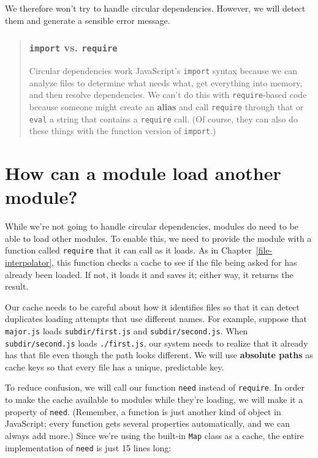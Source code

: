 \documentclass[krantzl]{krantz}
\newcommand{\chapref}[1]{Chapter~\ref{#1}}
\newcommand{\glossref}[1]{\textbf{#1}}
\newenvironment{callout}{\savenotes\begin{tBox}\begin{quotation}\toggletrue{inbox}\renewcommand{\thempfootnote}{\arabic{footnote}}}{\end{quotation}\vspace{\baselineskip}\end{tBox}\togglefalse{inbox}\spewnotes}
\begin{document}
We therefore won’t try to handle circular dependencies.
However,
we will detect them and generate a sensible error message.

\begin{callout}


\subsubsection*{\texttt{import} vs. \texttt{require}}


Circular dependencies work JavaScript’s \texttt{import} syntax
because we can analyze files to determine what needs what,
get everything into memory,
and then resolve dependencies.
We can’t do this with \texttt{require}-based code
because someone might create an \glossref{alias}
and call \texttt{require} through that
or \texttt{eval} a string that contains a \texttt{require} call.
(Of course, they can also do these things with the function version of \texttt{import}.)

\end{callout}

\section{How can a module load another module?}\label{module-loader-subload}


While we’re not going to handle circular dependencies,
modules do need to be able to load other modules.
To enable this,
we need to provide the module with a function called \texttt{require}
that it can call as it loads.
As in \chapref{file-interpolator},
this function checks a cache
to see if the file being asked for has already been loaded.
If not, it loads it and saves it;
either way, it returns the result.


Our cache needs to be careful about how it identifies files
so that it can detect duplicates loading attempts that use different names.
For example,
suppose that \texttt{major.js} loads \texttt{subdir/first.js} and \texttt{subdir/second.js}.
When \texttt{subdir/second.js} loads \texttt{./first.js},
our system needs to realize that it already has that file
even though the path looks different.
We will use \glossref{absolute paths} as cache keys
so that every file has a unique, predictable key.


To reduce confusion,
we will call our function \texttt{need} instead of \texttt{require}.
In order to make the cache available to modules while they’re loading,
we will make it a property of \texttt{need}.
(Remember,
a function is just another kind of object in JavaScript;
every function gets several properties automatically,
and we can always add more.)
Since we’re using the built-in \texttt{Map} class as a cache,
the entire implementation of \texttt{need} is just 15 lines long:
\end{document}
